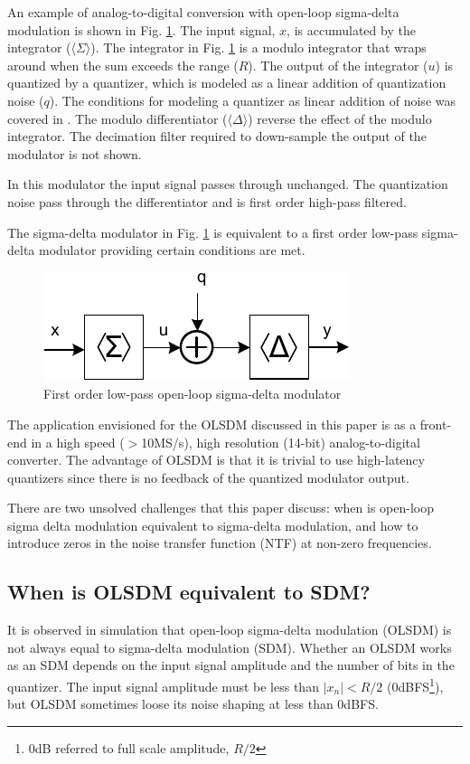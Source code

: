 An example of analog-to-digital conversion with open-loop sigma-delta
modulation is shown in Fig.
\ref{sdrfig:olsdm-basic}. The input
signal, $x$, is accumulated by the integrator ($\langle\Sigma\rangle$). The
integrator in Fig. \ref{sdrfig:olsdm-basic} is a modulo integrator that
wraps around when the sum exceeds the
range ($R$). The output of the integrator ($u$) is quantized by a quantizer,
which is modeled as a linear addition of
quantization noise ($q$). The conditions  for modeling a
quantizer as linear addition of noise was covered in 
\cite{widrow56}. The modulo differentiator ($\langle\Delta\rangle$) reverse the effect
of the modulo
integrator. The decimation filter required to down-sample the output of
the modulator is not shown. 

In this modulator the input signal passes through unchanged. The quantization noise pass through the
differentiator and is first order high-pass filtered. 

The sigma-delta modulator in Fig. \ref{sdrfig:olsdm-basic} is equivalent
to a first order
low-pass sigma-delta modulator providing certain conditions are met.

\begin{figure}[htbp]
\centerline{ \includegraphics[width=\myfigwidthb]{graphics/osd}}
  \caption{First order low-pass open-loop sigma-delta modulator}
  \label{sdrfig:olsdm-basic}
\end{figure}

The application envisioned for the  OLSDM discussed in this paper is as a front-end in a high
speed ($>$10MS/s), high resolution (14-bit)  analog-to-digital converter. The advantage of OLSDM is that
it is trivial to use high-latency quantizers since there is no feedback of the quantized
modulator output. 

There are two unsolved challenges that this paper discuss: when is
open-loop sigma delta modulation equivalent to sigma-delta modulation,
and how to introduce zeros in the noise transfer function (NTF) at non-zero
frequencies. 

\subsection{When is OLSDM equivalent to SDM?}
It is observed in simulation that open-loop sigma-delta
modulation (OLSDM) is not always equal to
sigma-delta modulation (SDM). Whether an OLSDM works as an SDM depends
on the input signal amplitude and the number of bits in the
quantizer. The input signal amplitude must be less than $|x_n| < R/2$
(0dBFS\footnote{0dB referred to full scale amplitude, $R/2$}), but OLSDM sometimes
loose its noise shaping at less than 0dBFS. 

